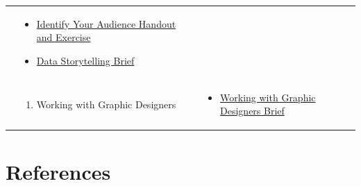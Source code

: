 \documentclass[
]{book}
\providecommand{\tightlist}{%
  \setlength{\itemsep}{0pt}\setlength{\parskip}{0pt}}
\begin{document}
\begin{longtable}[]{@{}lll@{}}
\begin{minipage}[t]{0.34\columnwidth}
\end{minipage} & \begin{minipage}[t]{0.42\columnwidth}\raggedright
\begin{itemize}
\tightlist
\item
  \href{files/M4S2_Data_Storytelling_Audience_Handout_Exercise.pdf}{Identify Your Audience Handout and Exercise}
\item
  \href{files/M4S2_Data_Storytelling_Brief.pdf}{Data Storytelling Brief}
\end{itemize}\strut
\end{minipage}\tabularnewline
\begin{minipage}[t]{0.15\columnwidth}\raggedright
\strut
\end{minipage} & \begin{minipage}[t]{0.34\columnwidth}\raggedright
\begin{enumerate}
\def\labelenumi{\arabic{enumi}.}
\setcounter{enumi}{2}
\tightlist
\item
  Working with Graphic Designers
\end{enumerate}\strut
\end{minipage} & \begin{minipage}[t]{0.42\columnwidth}\raggedright
\begin{itemize}
\tightlist
\item
  \href{files/M4S3_Working_With_Graphic_Designers_Brief.pdf}{Working with Graphic Designers Brief}
\end{itemize}\strut
\end{minipage}\tabularnewline
\bottomrule
\end{longtable}

\hypertarget{references}{%
\section{References}\label{references}}
\end{document}
